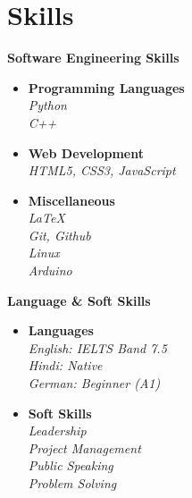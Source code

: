 \documentclass[10pt]{article} %
\begin{document}
{%
\hline 

\section*{Skills}

\begin{minipage}[t]{0.48\textwidth}
  \textbf{\large \color{slateblue} Software Engineering Skills}

  \begin{itemize}
    \item \textbf{Programming Languages} \\
    \textit{Python} \\
    \textit{C++}
    
    \item \textbf{Web Development} \\
    \textit{HTML5, CSS3, JavaScript}
    
    \item \textbf{Miscellaneous} \\
    \textit{LaTeX} \\
    \textit{Git, Github} \\
    \textit{Linux} \\
    \textit{Arduino}\\
  \end{itemize}
\end{minipage}
\hfill
\begin{minipage}[t]{0.48\textwidth}
  \textbf{\large \color{slateblue} Language \& Soft Skills}

  \begin{itemize}
    \item \textbf{Languages} \\
    \textit{English: IELTS Band 7.5} \\
    \textit{Hindi: Native} \\
    \textit{German: Beginner (A1)}

    \item \textbf{Soft Skills} \\
    \textit{Leadership} \\
    \textit{Project Management} \\
    \textit{Public Speaking} \\
    \textit{Problem Solving} \\
  \end{itemize}
\end{minipage}


}
\end{document}
